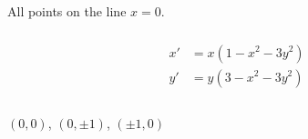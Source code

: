 \documentclass{article}
\begin{document}
All points on the line $x = 0$.

\setcounter{subsubsection}{14}
\subsubsection{}

\begin{align*}
  x' & = x (1 - x^2 - 3 y^2) \\
  y' & = y (3 - x^2 - 3 y^2) \\ \\
\end{align*}

$(0, 0)$, $(0, \pm 1)$, $(\pm 1, 0)$

\setcounter{subsubsection}{16}
\subsubsection{}
\end{document}

